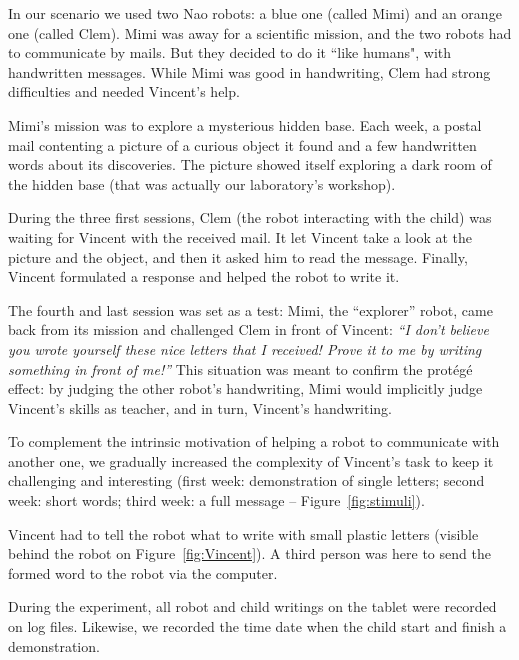 \documentclass{sig-alternate}
\begin{document}
In our scenario we used two Nao robots: a blue one 
(called Mimi) and an orange one (called Clem). Mimi was away for a 
scientific mission, and the two robots had to communicate by mails. But they decided to do it 
``like humans", with handwritten messages. While Mimi was good in handwriting, 
Clem had strong difficulties and needed Vincent's help.

Mimi's mission was to explore a mysterious hidden
base. Each week, a postal mail contenting
a picture of a curious object it found and a few handwritten words about its discoveries. 
The picture showed itself exploring 
a dark room of the hidden base (that was actually our laboratory's workshop). 

During the three first sessions, Clem (the robot interacting with the child) was waiting for Vincent
with the received mail. It let Vincent take a look at the picture and the object,
and then it asked him to read the message.
Finally, Vincent formulated a response and helped the robot to write it.

The fourth and last session was set as a test: Mimi, the ``explorer'' robot,
came back from its mission and challenged Clem in
front of Vincent: \emph{``I don't believe you wrote yourself these nice letters that I
received! Prove it to me by writing something in front of me!''} This situation
was meant to confirm the prot\'eg\'e effect: by judging the other robot's
handwriting, Mimi would implicitly judge Vincent's skills as
teacher, and in turn, Vincent's handwriting.

To complement the intrinsic motivation of helping a robot to communicate with another one, we
gradually increased the complexity of Vincent's task to keep it challenging and
interesting (first week: demonstration of single letters; second week:
short words; third week: a full message -- Figure~\ref{fig:stimuli}).

Vincent had to tell the robot what to write with small plastic letters (visible
behind the robot on Figure~\ref{fig:Vincent}). A third person was here to send
the formed word to the robot via the computer.

During the experiment, all robot and child writings on the tablet were recorded on log files. Likewise, we recorded the time date when the child start and finish a demonstration.  
\end{document}
